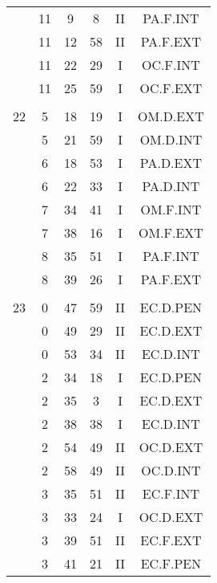 \documentclass[12pt, a4paper]{article}
\begin{document}
\begin{multicols}{3}
{\begin{tabular}{c c c c c c}
	 	 	 	 & 11 & 9 & 8 & II & PA.F.INT\\%
	 	 	 	 & 11 & 12 & 58 & II & PA.F.EXT\\%
	 	 	 	 & 11 & 22 & 29 & I & OC.F.INT\\%
	 	 	 	 & 11 & 25 & 59 & I & OC.F.EXT\\%
	 	 	 	 & & & & & \\%
	 	 	 	22 & 5 & 18 & 19 & I & OM.D.EXT\\%
	 	 	 	 & 5 & 21 & 59 & I & OM.D.INT\\%
	 	 	 	 & 6 & 18 & 53 & I & PA.D.EXT\\%
	 	 	 	 & 6 & 22 & 33 & I & PA.D.INT\\%
	 	 	 	 & 7 & 34 & 41 & I & OM.F.INT\\%
	 	 	 	 & 7 & 38 & 16 & I & OM.F.EXT\\%
	 	 	 	 & 8 & 35 & 51 & I & PA.F.INT\\%
	 	 	 	 & 8 & 39 & 26 & I & PA.F.EXT\\%
	 	 	 	 & & & & & \\%
	 	 	 	23 & 0 & 47 & 59 & II & EC.D.PEN\\%
	 	 	 	 & 0 & 49 & 29 & II & EC.D.EXT\\%
	 	 	 	 & 0 & 53 & 34 & II & EC.D.INT\\%
	 	 	 	 & 2 & 34 & 18 & I & EC.D.PEN\\%
	 	 	 	 & 2 & 35 & 3 & I & EC.D.EXT\\%
	 	 	 	 & 2 & 38 & 38 & I & EC.D.INT\\%
	 	 	 	 & 2 & 54 & 49 & II & OC.D.EXT\\%
	 	 	 	 & 2 & 58 & 49 & II & OC.D.INT\\%
	 	 	 	 & 3 & 35 & 51 & II & EC.F.INT\\%
	 	 	 	 & 3 & 33 & 24 & I & OC.D.EXT\\%
	 	 	 	 & 3 & 39 & 51 & II & EC.F.EXT\\%
	 	 	 	 & 3 & 41 & 21 & II & EC.F.PEN\\%
	 	 \end{tabular}
 	}
\end{multicols}
\end{document}

